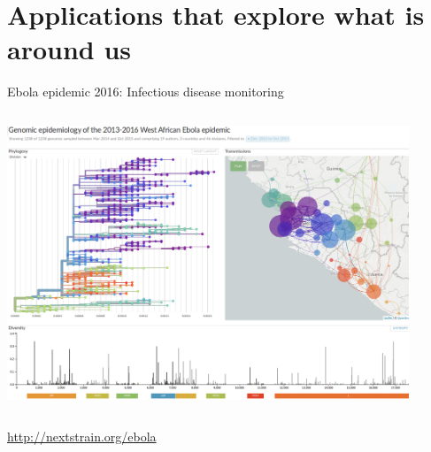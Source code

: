 \documentclass[10pt]{beamer}
\begin{document}

\section{Applications that explore what is around us}


\begin{frame}{Ebola epidemic 2016: Infectious disease monitoring}
	\begin{columns}
		\column{\dimexpr\paperwidth-10pt}
		\begin{center}
			\includegraphics[width=0.9\textwidth]{./figures/nextstrain2.png}\par
		\end{center}
	\end{columns}
	\url{http://nextstrain.org/ebola}
\end{frame}
\end{document}
